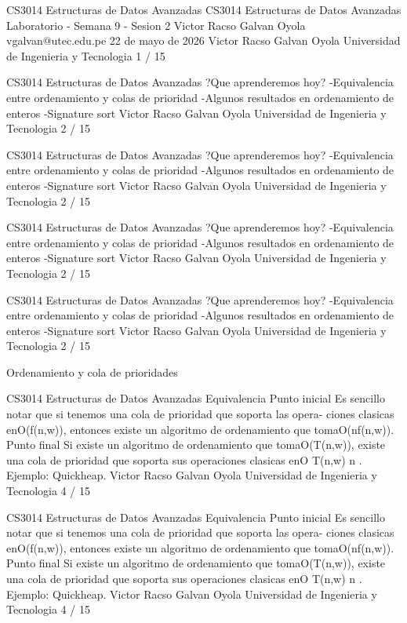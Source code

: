 \begin{description}[leftmargin=!,labelwidth=4.2em,style=nextline]
\item[Pag. 1] CS3014 Estructuras de Datos Avanzadas CS3014 Estructuras de Datos Avanzadas Laboratorio - Semana 9 - Sesion 2 Victor Racso Galvan Oyola vgalvan@utec.edu.pe 22 de mayo de 2026 Victor Racso Galvan Oyola Universidad de Ingenieria y Tecnologia 1 / 15
\item[Pag. 2] CS3014 Estructuras de Datos Avanzadas ?Que aprenderemos hoy? -Equivalencia entre ordenamiento y colas de prioridad -Algunos resultados en ordenamiento de enteros -Signature sort Victor Racso Galvan Oyola Universidad de Ingenieria y Tecnologia 2 / 15
\item[Pag. 3] CS3014 Estructuras de Datos Avanzadas ?Que aprenderemos hoy? -Equivalencia entre ordenamiento y colas de prioridad -Algunos resultados en ordenamiento de enteros -Signature sort Victor Racso Galvan Oyola Universidad de Ingenieria y Tecnologia 2 / 15
\item[Pag. 4] CS3014 Estructuras de Datos Avanzadas ?Que aprenderemos hoy? -Equivalencia entre ordenamiento y colas de prioridad -Algunos resultados en ordenamiento de enteros -Signature sort Victor Racso Galvan Oyola Universidad de Ingenieria y Tecnologia 2 / 15
\item[Pag. 5] CS3014 Estructuras de Datos Avanzadas ?Que aprenderemos hoy? -Equivalencia entre ordenamiento y colas de prioridad -Algunos resultados en ordenamiento de enteros -Signature sort Victor Racso Galvan Oyola Universidad de Ingenieria y Tecnologia 2 / 15
\item[Pag. 6] Ordenamiento y cola de prioridades
\item[Pag. 7] CS3014 Estructuras de Datos Avanzadas Equivalencia Punto inicial Es sencillo notar que si tenemos una cola de prioridad que soporta las opera- ciones clasicas enO(f(n,w)), entonces existe un algoritmo de ordenamiento que tomaO(nf(n,w)). Punto final Si existe un algoritmo de ordenamiento que tomaO(T(n,w)), existe una cola de prioridad que soporta sus operaciones clasicas enO T(n,w) n . Ejemplo: Quickheap. Victor Racso Galvan Oyola Universidad de Ingenieria y Tecnologia 4 / 15
\item[Pag. 8] CS3014 Estructuras de Datos Avanzadas Equivalencia Punto inicial Es sencillo notar que si tenemos una cola de prioridad que soporta las opera- ciones clasicas enO(f(n,w)), entonces existe un algoritmo de ordenamiento que tomaO(nf(n,w)). Punto final Si existe un algoritmo de ordenamiento que tomaO(T(n,w)), existe una cola de prioridad que soporta sus operaciones clasicas enO T(n,w) n . Ejemplo: Quickheap. Victor Racso Galvan Oyola Universidad de Ingenieria y Tecnologia 4 / 15

\end{description}
